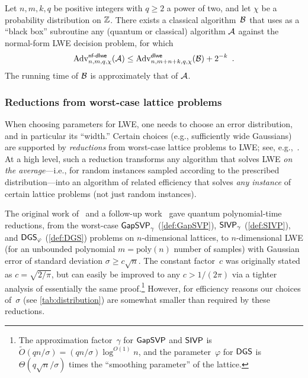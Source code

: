 \begin{theorem}
  \label{thm:nf-dlwe-to-dlwe}
  Let $n, m, k, q$ be positive integers with $q \geq 2$ a power of
  two, and let $\chi$ be a probability distribution on $\mathbb{Z}$. There
  exists a classical algorithm~$\mathcal{B}$ that uses as a ``black
  box'' subroutine any (quantum or classical) algorithm $\mathcal{A}$
  against the normal-form LWE decision problem, for which
  \[ \mathrm{Adv}^{\textsf{\upshape\mdseries \textsf{\upshape\mdseries nf-dlwe}}}_{n,m,q,\chi}(\mathcal{A}) \leq \mathrm{Adv}^{\textsf{\upshape\mdseries \textsf{\upshape\mdseries dlwe}}}_{n,m + n +
      k,q,\chi}(\mathcal{B}) + 2^{-k} \enspace . \] The running time of
  $\mathcal{B}$ is approximately that of $\mathcal{A}$.
\end{theorem}

\subsubsection{Reductions from worst-case lattice problems}
\label{sec:strength:lattice}

When choosing parameters for LWE, one needs to choose an error
distribution, and in particular its ``width.''  Certain choices (e.g.,
sufficiently wide Gaussians) are supported by \emph{reductions} from
worst-case lattice problems to LWE; see,
e.g.,~\cite{Reg09,STOC:Peikert09,STOC:BLPRS13,STOC:PeiRegSte17}.  At a
high level, such a reduction transforms any algorithm that solves LWE
\emph{on the average}---i.e., for random instances sampled according
to the prescribed distribution---into an algorithm of related
efficiency that solves \emph{any instance} of certain lattice problems
(not just random instances).



The original work of~\cite{Reg09} and a follow-up
work~\cite{STOC:PeiRegSte17} gave quantum polynomial-time reductions,
from the worst-case $\mathsf{GapSVP}_\gamma$ (\autoref{def:GapSVP}),
$\mathsf{SIVP}_\gamma$ (\autoref{def:SIVP}), and $\mathsf{DGS}_{\varphi}$
(\autoref{def:DGS}) problems on $n$-dimensional lattices, to
$n$-dimensional LWE (for an unbounded polynomial $m=\text{poly}(n)$
number of samples) with Gaussian error of standard deviation
$\sigma \geq c\sqrt{n}$.  The constant factor~$c$ was originally
stated as $c=\sqrt{2/\pi}$, but can easily be improved to any
$c > 1/(2\pi)$ via a tighter analysis of essentially the same
proof.\footnote{The approximation factor~$\gamma$ for $\mathsf{GapSVP}$ and
  $\mathsf{SIVP}$ is $\tilde{O}(qn/\sigma) = (qn/\sigma) \log^{O(1)} n$, and
  the parameter~$\varphi$ for $\mathsf{DGS}$ is $\Theta(q\sqrt{n}/\sigma)$
  times the ``smoothing parameter'' of the lattice.} However, for
efficiency reasons our choices of~$\sigma$ (see
\autoref{tab:distribution}) are somewhat smaller than required by these
reductions.

